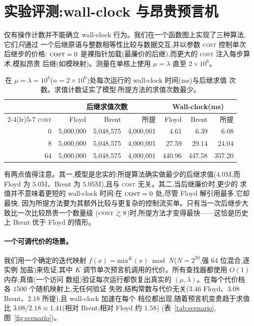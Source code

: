 \documentclass[11pt]{ctexart}
\begin{document}
\section{实验评测:wall-clock 与昂贵预言机}
\label{sec:wallclock}

仅有操作计数并不能确立 wall-clock 行为。我们在一个函数图上实现了三种算法,它们\emph{只}通过
一个后继原语与整数相等性比较与数据交互,并以参数 \textsc{cost} 控制单次后继步的价格:
$\textsc{cost}=0$ 是裸指针加载(最廉价的后继),而更大的 \textsc{cost} 注入每步算术,模拟昂贵
后继(如模映射)。测量在单核上使用 $\mu=\lambda$ 直至 $2\times10^6$。

\begin{table}[H]\centering
\caption{在 $\mu=\lambda=10^6$($n=2\times10^6$)处每次运行的 wall-clock 时间(ms)与后继求值
次数。求值计数证实了模型:所提方法的求值次数最少。}
\label{tab:wallclock}
\begin{tabular}{rrrrrrr}
\toprule
 & \multicolumn{3}{c}{后继求值次数} & \multicolumn{3}{c}{Wall-clock(ms)} \\
\cmidrule(lr){2-4}\cmidrule(lr){5-7}
\textsc{cost} & Floyd & Brent & 所提 & Floyd & Brent & 所提 \\
\midrule
0  & 5{,}000{,}000 & 5{,}048{,}575 & 4{,}000{,}001 & 4.61 & 6.39 & 6.08 \\
8  & 5{,}000{,}000 & 5{,}048{,}575 & 4{,}000{,}001 & 27.59 & 29.14 & 24.04 \\
64 & 5{,}000{,}000 & 5{,}048{,}575 & 4{,}000{,}001 & 440.96 & 447.58 & 357.20 \\
\bottomrule
\end{tabular}
\end{table}

有两点值得注意。其一,模型是忠实的:所提算法确实做最少的后继求值($4.0\text{M}$,而 Floyd 为
$5.0\text{M}$、Brent 为 $5.05\text{M}$),且与 \textsc{cost} 无关。其二,当后继廉价时,更少的
求值并不意味着更短的 wall-clock 时间:在 $\textsc{cost}=0$ 处,尽管 Floyd 解引用最多,它却最快,
因为所提方法要为其额外比较与更复杂的控制流买单。只有当一次后继步大致比一次比较昂贵一个数量级
($\textsc{cost}\gtrsim8$)时,所提方法才变得最快——这恰是历史上 Brent 优于 Floyd 的情形。

\paragraph{一个可调代价的场景。}
我们用一个确定的迭代映射 $f(x)=\mathrm{mix}^{K}(x)\bmod N$($N=2^{20}$,强 64 位混合,逐实例
加盐)来佐证,其中 $K$ 调节单次预言机调用的代价。所有查找器都使用 $O(1)$ 内存;真值(一个访问
数组)验证每次运行都恢复出真实的 $(\mu,\lambda)$。在每个代价档各 $1500$ 个随机映射上,无任何验证
失败,结构常数与代价无关($3.46$ Floyd、$3.08$ Brent、$2.18$ 所提),且 wall-clock 加速在每个
档位都出现,随着预言机变贵趋于求值比 $3.08/2.18\approx1.41$(相对 Brent;相对 Floyd 约 $1.58$)
(表~\ref{tab:scenario},图~\ref{fig:scenario})。
\end{document}
